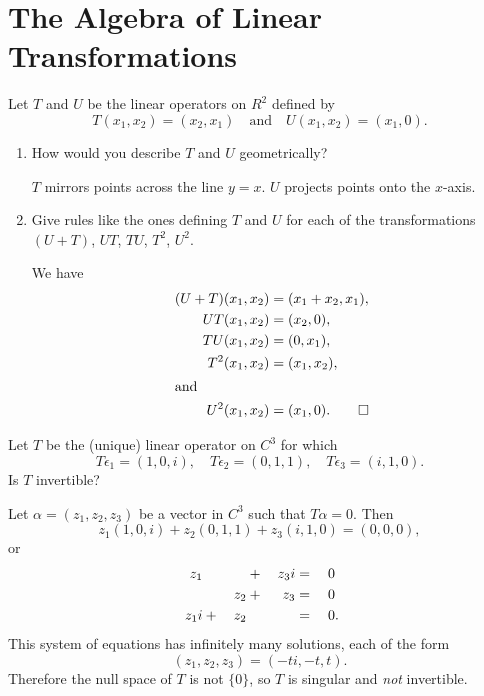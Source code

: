 \section{The Algebra of Linear Transformations}

 Let $T$ and $U$ be the linear operators on $R^2$ defined by
\begin{equation*}
  T(x_1,x_2) = (x_2,x_1) \quad\text{and}\quad
  U(x_1,x_2) = (x_1,0).
\end{equation*}
\begin{enumerate}
\item How would you describe $T$ and $U$ geometrically?
  \begin{solution}
    $T$ mirrors points across the line $y = x$. $U$ projects points
    onto the $x$-axis.
  \end{solution}

\item Give rules like the ones defining $T$ and $U$ for each of the
  transformations $(U + T)$, $UT$, $TU$, $T^2$, $U^2$.
  \begin{solution}
    We have
    \begin{align*}
      (U + T)(x_1,x_2) &= (x_1 + x_2, x_1), \\
      UT(x_1,x_2) &= (x_2, 0), \\
      TU(x_1,x_2) &= (0, x_1), \\
      T^2(x_1,x_2) &= (x_1,x_2), \\
      \intertext{and}
      U^2(x_1,x_2) &= (x_1,0). \qedhere
    \end{align*}
  \end{solution}
\end{enumerate}

 Let $T$ be the (unique) linear operator on $C^3$ for which
\begin{equation*}
  T\epsilon_1 = (1, 0, i), \quad
  T\epsilon_2 = (0, 1, 1), \quad
  T\epsilon_3 = (i, 1, 0).
\end{equation*}
Is $T$ invertible?
\begin{solution}
  Let $\alpha = (z_1,z_2,z_3)$ be a vector in $C^3$ such that
  $T\alpha = 0$. Then
  \begin{equation*}
    z_1(1, 0, i) + z_2(0, 1, 1) + z_3(i, 1, 0) = (0, 0, 0),
  \end{equation*}
  or
  \begin{alignat*}{4}
    z_1 && &{}+{}& z_3i &{}={}& 0 \\
    && z_2 &{}+{}& z_3 &{}={}& 0 \\
    z_1i &{}+{}& z_2 && &{}={}& 0\rlap.
  \end{alignat*}
  This system of equations has infinitely many solutions, each of the
  form
  \begin{equation*}
    (z_1,z_2,z_3) = (-ti, -t, t).
  \end{equation*}
  Therefore the null space of $T$ is not $\{0\}$, so $T$ is singular
  and {\em not} invertible.
\end{solution}

